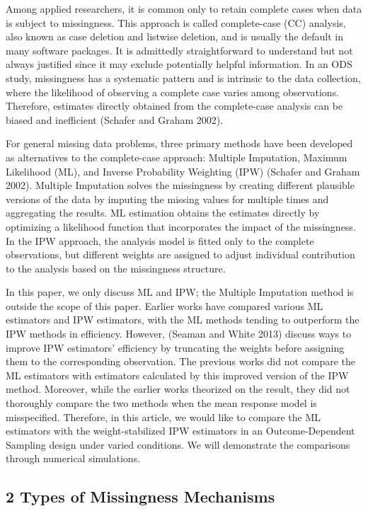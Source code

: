 \documentclass[
  12pt,
]{article}
\begin{document}
Among applied researchers, it is common only to retain complete cases
when data is subject to missingness. This approach is called
complete-case (CC) analysis, also known as case deletion and listwise
deletion, and is usually the default in many software packages. It is
admittedly straightforward to understand but not always justified since
it may exclude potentially helpful information. In an ODS study,
missingness has a systematic pattern and is intrinsic to the data
collection, where the likelihood of observing a complete case varies
among observations. Therefore, estimates directly obtained from the
complete-case analysis can be biased and inefficient (Schafer and Graham
2002).

For general missing data problems, three primary methods have been
developed as alternatives to the complete-case approach: Multiple
Imputation, Maximum Likelihood (ML), and Inverse Probability Weighting
(IPW) (Schafer and Graham 2002). Multiple Imputation solves the
missingness by creating different plausible versions of the data by
imputing the missing values for multiple times and aggregating the
results. ML estimation obtains the estimates directly by optimizing a
likelihood function that incorporates the impact of the missingness. In
the IPW approach, the analysis model is fitted only to the complete
observations, but different weights are assigned to adjust individual
contribution to the analysis based on the missingness structure.

In this paper, we only discuss ML and IPW; the Multiple Imputation
method is outside the scope of this paper. Earlier works have compared
various ML estimators and IPW estimators, with the ML methods tending to
outperform the IPW methods in efficiency. However, (Seaman and White
2013) discuss ways to improve IPW estimators' efficiency by truncating
the weights before assigning them to the corresponding observation. The
previous works did not compare the ML estimators with estimators
calculated by this improved version of the IPW method. Moreover, while
the earlier works theorized on the result, they did not thoroughly
compare the two methods when the mean response model is misspecified.
Therefore, in this article, we would like to compare the ML estimators
with the weight-stabilized IPW estimators in an Outcome-Dependent
Sampling design under varied conditions. We will demonstrate the
comparisons through numerical simulations.

\hypertarget{types-of-missingness-mechanisms}{%
\subsection{2 Types of Missingness
Mechanisms}\label{types-of-missingness-mechanisms}}
\end{document}

